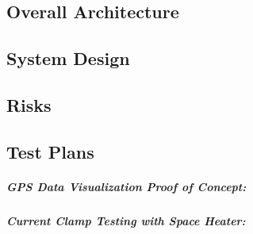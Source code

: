 \subsection{Overall Architecture}


\subsection{System Design}


\subsection{Risks}

\subsection{Test Plans}
\subparagraph{GPS Data Visualization Proof of Concept:}
\subparagraph{Current Clamp Testing with Space Heater:}